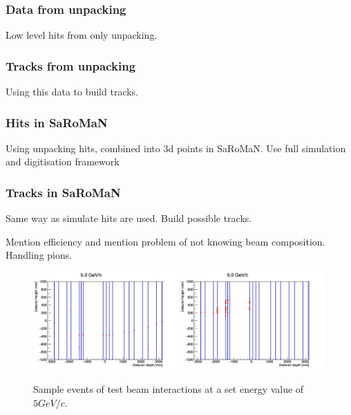\subsubsection{Data from unpacking}
Low level hits from only unpacking.

\subsubsection{Tracks from unpacking}
Using this data to build tracks.

\subsubsection{Hits in SaRoMaN}
Using unpacking hits, combined into 3d points in SaRoMaN. Use full simulation and digitisation framework


\subsubsection{Tracks in SaRoMaN}
Same way as simulate hits are used. Build possible tracks.


Mention efficiency and mention problem of not knowing beam composition. Handling pions.


\begin{figure}[h!]
\centering
\includegraphics[width=0.49\textwidth]{figures/oldStudies/m5GeVevent2.jpg}
\includegraphics[width=0.49\textwidth]{figures/oldStudies/m5GeVevent3.jpg}
\caption{Sample events of test beam interactions at a set energy value of $5GeV/c$.}
\label{fig:EventsInitial}
\end{figure}

